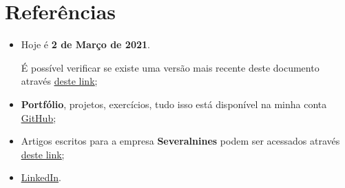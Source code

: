 \section{Referências}

\begin{itemize}

  \item Hoje é \textbf{2 de Março de 2021}.

    É possível verificar se existe uma versão mais recente deste documento através
    \underline{\href{https://github.com/aslthiago/cv/releases/}{deste link}};

  \item \textbf{Portfólio}, projetos, exercícios, tudo isso está disponível na minha conta
    \underline{\href{https://github.com/aslthiago/}{GitHub}};

  \item Artigos escritos para a empresa \textbf{Severalnines} podem ser acessados através
    \underline{\href{https://severalnines.com/database-blog/author/25319}{deste link}};

  \item \underline{\href{https://www.linkedin.com/in/aslthiago/}{LinkedIn}}.
\end{itemize}
